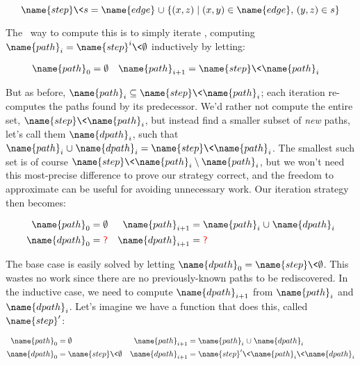 \[
\name{step} \<s = \name{edge} \cup
\setfor{(x,z)}{(x,y) \in \name{edge},\, (y,z) \in s}
\]%

\noindent
The \naive\ way to compute this is to simply iterate , computing $\name{path}_i = \name{step}^i \<\emptyset$ inductively by letting:

\begin{align*}
  \name{path}_0 &= \emptyset
  &
  \name{path}_{i+1} &= \name{step} \<\name{path}_i
\end{align*}

\noindent
But as before, $\name{path}_i \subseteq \name{step}\<\name{path}_i$; each iteration re-computes the paths found by its predecessor.
%
We'd rather not compute the entire set, $\name{step} \< \name{path}_i$, but instead find a smaller subset of \emph{new} paths, let's call them $\name{dpath}_i$, such that $\name{path}_i \cup \name{dpath}_i = \name{step} \<\name{path}_i$.
%
The smallest such set is of course $\name{step}\<\name{path}_i \setminus \name{path}_i$, but we won't need this most-precise difference to prove our strategy correct, and the freedom to approximate can be useful for avoiding unnecessary work. 
%
Our iteration strategy then becomes:

\begin{align*}
  \name{path}_0 &= \emptyset
  &
  \name{path}_{i+1} &= \name{path}_i \cup \name{dpath}_i
  \\
  \name{dpath}_0 &= \textsf{\color{red}?} & \name{dpath}_{i+1} &= \textsf{\color{red}?}
\end{align*}

\noindent
The base case is easily solved by letting $\name{dpath}_0 = \name{step}\<\emptyset$. This wastes no work since there are no previously-known paths to be rediscovered. In the inductive case, we need to compute $\name{dpath}_{i+1}$ from $\name{path}_i$ and $\name{dpath}_i$. Let's imagine we have a function that does this, called $\name{step}'$:

\begin{align*}
  \name{path}_0 &= \emptyset
  &
  \name{path}_{i+1} &= \name{path}_i \cup \name{dpath}_i\\
  \name{dpath}_0 &= \name{step}\<\emptyset
  &
  \name{dpath}_{i+1} &= \name{step}' \<\name{path}_i \<\name{dpath}_i
\end{align*}

